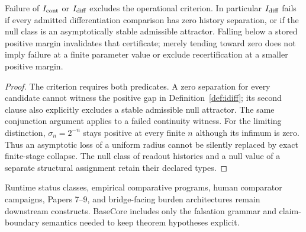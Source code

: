 \begin{proposition}\label{prop:continuity-nonnull-relevance}
Failure of $I_{\mathrm{cont}}$ or $I_{\mathrm{diff}}$ excludes the operational criterion. In
particular $I_{\mathrm{diff}}$ fails if every admitted differentiation comparison has
zero history separation, or if the null class is an asymptotically stable
admissible attractor. Falling below a stored positive margin invalidates that
certificate; merely tending toward zero does not imply failure at a finite
parameter value or exclude recertification at a smaller positive margin.
\end{proposition}
\begin{proof}
The criterion requires both predicates. A zero separation for every candidate
cannot witness the positive gap in Definition~\ref{def:idiff}; its second
clause also explicitly excludes a stable admissible null attractor.
The same conjunction argument applies to a failed continuity witness.
For the limiting distinction, $\sigma_n=2^{-n}$ stays positive at every finite
$n$ although its infimum is zero. Thus an asymptotic loss of a uniform radius
cannot be silently replaced by exact finite-stage collapse. The null class of
readout histories and a null value of a separate structural assignment retain
their declared types.
\end{proof}

\begin{remark}
Runtime status classes, empirical comparative programs, human comparator
campaigns, Papers 7--9, and bridge-facing burden architectures remain downstream
constructs. BaseCore includes only the falsation grammar and claim-boundary
semantics needed to keep theorem hypotheses explicit.
\end{remark}

